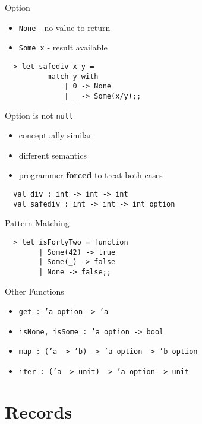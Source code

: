 \documentclass{beamer}
\begin{document}
\begin{frame}[fragile]{Option}
  \begin{itemize}
    \item \texttt{None} - no value to return
    \item \texttt{Some x} - result available
  \end{itemize}
  \pause
  \begin{verbatim}
  > let safediv x y =
          match y with
              | 0 -> None
              | _ -> Some(x/y);;
  \end{verbatim}
\end{frame}

\begin{frame}[fragile]{Option is not \texttt{null}}
  \begin{itemize}
    \item conceptually similar
    \item different semantics
    \item programmer \textbf{forced} to treat both cases
  \end{itemize}
  \begin{verbatim}
  val div : int -> int -> int
  val safediv : int -> int -> int option
  \end{verbatim}
\end{frame}

\begin{frame}[fragile]{Pattern Matching}
  \begin{verbatim}
  > let isFortyTwo = function
        | Some(42) -> true
        | Some(_) -> false
        | None -> false;;
  \end{verbatim}
\end{frame}

\begin{frame}{Other Functions}
  \begin{itemize}[<+->]
    \item \texttt{get : 'a option -> 'a}
    \item \texttt{isNone, isSome : 'a option -> bool}
    \item \texttt{map : ('a -> 'b) -> 'a option -> 'b option}
    \item \texttt{iter : ('a -> unit) -> 'a option -> unit}
  \end{itemize}
\end{frame}

\section{Records}
\frame{\tableofcontents[currentsection]}
\end{document}
